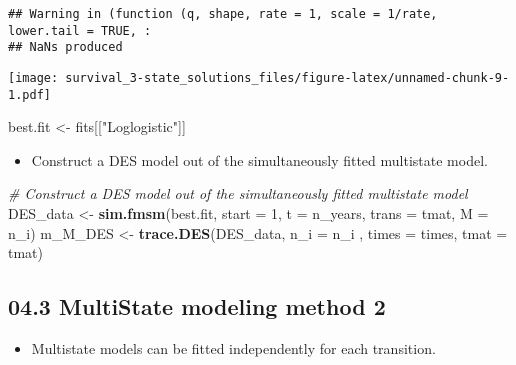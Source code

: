 \documentclass[
]{article}
\newenvironment{Shaded}{\begin{snugshade}}{\end{snugshade}}
\newcommand{\CommentTok}[1]{\textcolor[rgb]{0.56,0.35,0.01}{\textit{#1}}}
\newcommand{\DataTypeTok}[1]{\textcolor[rgb]{0.13,0.29,0.53}{#1}}
\newcommand{\DecValTok}[1]{\textcolor[rgb]{0.00,0.00,0.81}{#1}}
\newcommand{\KeywordTok}[1]{\textcolor[rgb]{0.13,0.29,0.53}{\textbf{#1}}}
\newcommand{\NormalTok}[1]{#1}
\newcommand{\StringTok}[1]{\textcolor[rgb]{0.31,0.60,0.02}{#1}}
\providecommand{\tightlist}{%
  \setlength{\itemsep}{0pt}\setlength{\parskip}{0pt}}
\begin{document}
\begin{verbatim}
## Warning in (function (q, shape, rate = 1, scale = 1/rate, lower.tail = TRUE, :
## NaNs produced
\end{verbatim}

\texttt{[image: survival\_3-state\_solutions\_files/figure-latex/unnamed-chunk-9-1.pdf]}

\begin{Shaded}
\begin{Highlighting}[]
\NormalTok{best.fit <-}\StringTok{ }\NormalTok{fits[[}\StringTok{"Loglogistic"}\NormalTok{]]}
\end{Highlighting}
\end{Shaded}

\begin{itemize}
\tightlist
\item
  Construct a DES model out of the simultaneously fitted multistate
  model.
\end{itemize}

\begin{Shaded}
\begin{Highlighting}[]
\CommentTok{# Construct a DES model out of the simultaneously fitted multistate model}
\NormalTok{DES_data <-}\StringTok{ }\KeywordTok{sim.fmsm}\NormalTok{(best.fit, }\DataTypeTok{start =} \DecValTok{1}\NormalTok{, }\DataTypeTok{t =}\NormalTok{ n_years, }\DataTypeTok{trans =}\NormalTok{ tmat, }\DataTypeTok{M =}\NormalTok{ n_i)}
\NormalTok{m_M_DES  <-}\StringTok{ }\KeywordTok{trace.DES}\NormalTok{(DES_data, }\DataTypeTok{n_i  =}\NormalTok{ n_i , }\DataTypeTok{times =}\NormalTok{ times, }\DataTypeTok{tmat =}\NormalTok{ tmat)}
\end{Highlighting}
\end{Shaded}

\hypertarget{multistate-modeling-method-2}{%
\subsection{04.3 MultiState modeling method
2}\label{multistate-modeling-method-2}}

\begin{itemize}
\tightlist
\item
  Multistate models can be fitted independently for each transition.
\end{itemize}
\end{document}
